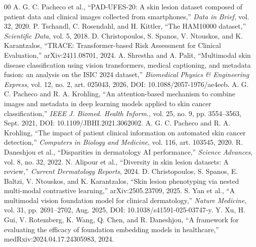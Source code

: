 \documentclass[conference]{IEEEtran}
\begin{document}
\vspace{-4pt}
\scriptsize
\begin{thebibliography}{00}
 A. G. C. Pacheco et al., ``PAD-UFES-20: A skin lesion dataset composed of patient data and clinical images collected from smartphones,'' \emph{Data in Brief}, vol. 32, 2020.
 P. Tschandl, C. Rosendahl, and H. Kittler, ``The HAM10000 dataset,'' \emph{Scientific Data}, vol. 5, 2018.
 D. Christopoulos, S. Spanos, V. Ntouskos, and K. Karantzalos, ``TRACE: Transformer-based Risk Assessment for Clinical Evaluation,'' arXiv:2411.08701, 2024.
 A. Shrestha and A. Palit, ``Multimodal skin disease classification using vision transformers, medical captioning, and metadata fusion: an analysis on the ISIC 2024 dataset,'' \emph{Biomedical Physics \& Engineering Express}, vol. 12, no. 2, art. 025043, 2026, DOI: 10.1088/2057-1976/ae4eeb.
 A. G. C. Pacheco and R. A. Krohling, ``An attention-based mechanism to combine images and metadata in deep learning models applied to skin cancer classification,'' \emph{IEEE J. Biomed. Health Inform.}, vol. 25, no. 9, pp. 3554--3563, Sept. 2021, DOI: 10.1109/JBHI.2021.3062002.
 A. G. C. Pacheco and R. A. Krohling, ``The impact of patient clinical information on automated skin cancer detection,'' \emph{Computers in Biology and Medicine}, vol. 116, art. 103545, 2020.
 R. Daneshjou et al., ``Disparities in dermatology AI performance,'' \emph{Science Advances}, vol. 8, no. 32, 2022.
 N. Alipour et al., ``Diversity in skin lesion datasets: A review,'' \emph{Current Dermatology Reports}, 2024.
 D. Christopoulos, S. Spanos, E. Baltzi, V. Ntouskos, and K. Karantzalos, ``Skin lesion phenotyping via nested multi-modal contrastive learning,'' arXiv:2505.23709, 2025.
 S. Yan et al., ``A multimodal vision foundation model for clinical dermatology,'' \emph{Nature Medicine}, vol. 31, pp. 2691--2702, Aug. 2025, DOI: 10.1038/s41591-025-03747-y.
 Y. Xu, H. Gui, V. Rotemberg, K. Wang, Q. Chen, and R. Daneshjou, ``A framework for evaluating the efficacy of foundation embedding models in healthcare,'' medRxiv:2024.04.17.24305983, 2024.
\end{thebibliography}
\end{document}
